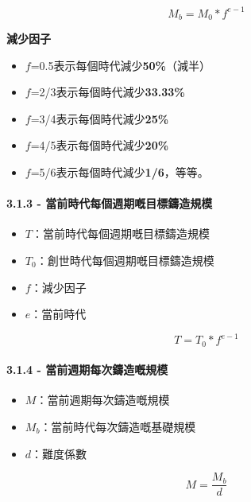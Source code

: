 \documentclass[
]{article}
\providecommand{\tightlist}{%
  \setlength{\itemsep}{0pt}\setlength{\parskip}{0pt}}
\begin{document}
\begin{equation}
M_b = M_0 * f^{e-1}
\end{equation}

\textbf{減少因子}

\begin{itemize}
\tightlist
\item
  \(f\)=0.5表示每個時代減少\textbf{50\%}（減半）
\item
  \(f\)=2/3表示每個時代減少\textbf{33.33\%}
\item
  \(f\)=3/4表示每個時代減少\textbf{25\%}
\item
  \(f\)=4/5表示每個時代減少\textbf{20\%}
\item
  \(f\)=5/6表示每個時代減少\textbf{1/6}，等等。
\end{itemize}

\paragraph{3.1.3 -
當前時代每個週期嘅目標鑄造規模}\label{ux7576ux524dux6642ux4ee3ux6bcfux500bux9031ux671fux5605ux76eeux6a19ux9444ux9020ux898fux6a21}

\begin{itemize}
\tightlist
\item
  \(T\)：當前時代每個週期嘅目標鑄造規模
\item
  \(T_0\)：創世時代每個週期嘅目標鑄造規模
\item
  \(f\)：減少因子
\item
  \(e\)：當前時代
\end{itemize}

\begin{equation}
 T = T_0 * f^{e-1}
\end{equation}

\paragraph{3.1.4 -
當前週期每次鑄造嘅規模}\label{ux7576ux524dux9031ux671fux6bcfux6b21ux9444ux9020ux5605ux898fux6a21}

\begin{itemize}
\tightlist
\item
  \(M\)：當前週期每次鑄造嘅規模
\item
  \(M_b\)：當前時代每次鑄造嘅基礎規模
\item
  \(d\)：難度係數
\end{itemize}

\begin{equation}
M = \frac{M_b}{d}
\end{equation}
\end{document}
